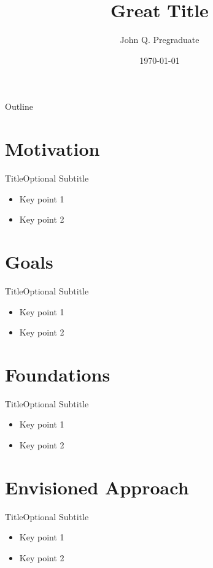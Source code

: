 \documentclass[11pt]{beamer}
\title{Great Title}
\author{John Q. Pregraduate}
\date{\today}
\begin{document}
	
	\begin{frame}{Outline}{}
		\tableofcontents[hideallsubsections]
	\end{frame}
	
	\section{Motivation}
	
	\begin{frame}{Title}{Optional Subtitle}
		\begin{itemize}
			\item Key point 1
			\item Key point 2
		\end{itemize}
	\end{frame}
	
	\section{Goals}
	
	\begin{frame}{Title}{Optional Subtitle}
		\begin{itemize}
			\item Key point 1
			\item Key point 2
		\end{itemize}
	\end{frame}
	
	\section{Foundations}
	
	\begin{frame}{Title}{Optional Subtitle}
		\begin{itemize}
			\item Key point 1
			\item Key point 2
		\end{itemize}
	\end{frame}
	
	\section{Envisioned Approach}
	
	\begin{frame}{Title}{Optional Subtitle}
		\begin{itemize}
			\item Key point 1
			\item Key point 2
		\end{itemize}
	\end{frame}
	
\end{document}

